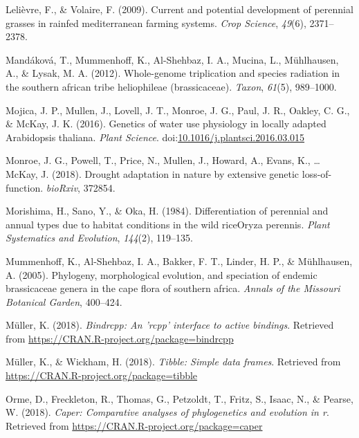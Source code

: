 \documentclass[man,floatsintext]{apa6}
\theoremstyle{definition}
\theoremstyle{definition}
\theoremstyle{definition}
\theoremstyle{remark}
\begin{document}
\leavevmode\hypertarget{ref-lelievre2009current}{}%
Lelièvre, F., \& Volaire, F. (2009). Current and potential development
of perennial grasses in rainfed mediterranean farming systems.
\emph{Crop Science}, \emph{49}(6), 2371--2378.

\leavevmode\hypertarget{ref-mandakova2012whole}{}%
Mandáková, T., Mummenhoff, K., Al-Shehbaz, I. A., Mucina, L.,
Mühlhausen, A., \& Lysak, M. A. (2012). Whole-genome triplication and
species radiation in the southern african tribe heliophileae
(brassicaceae). \emph{Taxon}, \emph{61}(5), 989--1000.

\leavevmode\hypertarget{ref-Mojica2016}{}%
Mojica, J. P., Mullen, J., Lovell, J. T., Monroe, J. G., Paul, J. R.,
Oakley, C. G., \& McKay, J. K. (2016). Genetics of water use physiology
in locally adapted Arabidopsis thaliana. \emph{Plant Science}.
doi:\href{https://doi.org/10.1016/j.plantsci.2016.03.015}{10.1016/j.plantsci.2016.03.015}

\leavevmode\hypertarget{ref-monroe2018drought}{}%
Monroe, J. G., Powell, T., Price, N., Mullen, J., Howard, A., Evans, K.,
\ldots{} McKay, J. (2018). Drought adaptation in nature by extensive
genetic loss-of-function. \emph{bioRxiv}, 372854.

\leavevmode\hypertarget{ref-morishima1984differentiation}{}%
Morishima, H., Sano, Y., \& Oka, H. (1984). Differentiation of perennial
and annual types due to habitat conditions in the wild riceOryza
perennis. \emph{Plant Systematics and Evolution}, \emph{144}(2),
119--135.

\leavevmode\hypertarget{ref-mummenhoff2005phylogeny}{}%
Mummenhoff, K., Al-Shehbaz, I. A., Bakker, F. T., Linder, H. P., \&
Mühlhausen, A. (2005). Phylogeny, morphological evolution, and
speciation of endemic brassicaceae genera in the cape flora of southern
africa. \emph{Annals of the Missouri Botanical Garden}, 400--424.

\leavevmode\hypertarget{ref-R-bindrcpp}{}%
Müller, K. (2018). \emph{Bindrcpp: An 'rcpp' interface to active
bindings}. Retrieved from
\url{https://CRAN.R-project.org/package=bindrcpp}

\leavevmode\hypertarget{ref-R-tibble}{}%
Müller, K., \& Wickham, H. (2018). \emph{Tibble: Simple data frames}.
Retrieved from \url{https://CRAN.R-project.org/package=tibble}

\leavevmode\hypertarget{ref-R-caper}{}%
Orme, D., Freckleton, R., Thomas, G., Petzoldt, T., Fritz, S., Isaac,
N., \& Pearse, W. (2018). \emph{Caper: Comparative analyses of
phylogenetics and evolution in r}. Retrieved from
\url{https://CRAN.R-project.org/package=caper}
\end{document}
